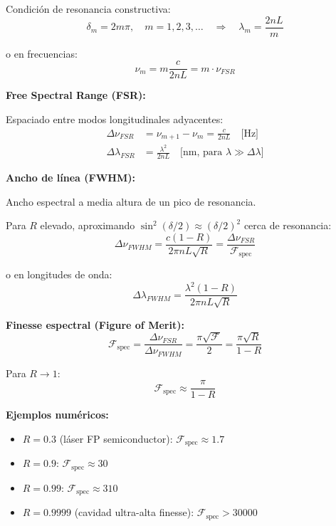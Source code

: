 \documentclass[11pt,a4paper]{article}
\begin{document}
Condición de resonancia constructiva:
\begin{equation}
    \delta_m = 2m\pi, \quad m = 1, 2, 3, \ldots \quad \Rightarrow \quad \lambda_m = \frac{2nL}{m}
\end{equation}

o en frecuencias:
\begin{equation}
    \nu_m = m\frac{c}{2nL} = m \cdot \nu_{FSR}
\end{equation}

\textbf{Free Spectral Range (FSR):}

Espaciado entre modos longitudinales adyacentes:
\begin{align}
    \Delta\nu_{FSR} &= \nu_{m+1} - \nu_m = \frac{c}{2nL} \quad \text{[Hz]}\\
    \Delta\lambda_{FSR} &= \frac{\lambda^2}{2nL} \quad \text{[nm, para } \lambda \gg \Delta\lambda\text{]}
\end{align}

\textbf{Ancho de línea (FWHM):}

Ancho espectral a media altura de un pico de resonancia.

Para $R$ elevado, aproximando $\sin^2(\delta/2) \approx (\delta/2)^2$ cerca de resonancia:
\begin{equation}
    \Delta\nu_{FWHM} = \frac{c(1-R)}{2\pi nL\sqrt{R}} = \frac{\Delta\nu_{FSR}}{\mathcal{F}_{\text{spec}}}
\end{equation}

o en longitudes de onda:
\begin{equation}
    \Delta\lambda_{FWHM} = \frac{\lambda^2(1-R)}{2\pi nL\sqrt{R}}
\end{equation}

\textbf{Finesse espectral (Figure of Merit):}
\begin{equation}
    \mathcal{F}_{\text{spec}} = \frac{\Delta\nu_{FSR}}{\Delta\nu_{FWHM}} = \frac{\pi\sqrt{\mathcal{F}}}{2} = \frac{\pi\sqrt{R}}{1-R}
\end{equation}

Para $R \to 1$:
\begin{equation}
    \mathcal{F}_{\text{spec}} \approx \frac{\pi}{1-R}
\end{equation}

\textbf{Ejemplos numéricos:}
\begin{itemize}
    \item $R = 0.3$ (láser FP semiconductor): $\mathcal{F}_{\text{spec}} \approx 1.7$
    \item $R = 0.9$: $\mathcal{F}_{\text{spec}} \approx 30$
    \item $R = 0.99$: $\mathcal{F}_{\text{spec}} \approx 310$
    \item $R = 0.9999$ (cavidad ultra-alta finesse): $\mathcal{F}_{\text{spec}} > 30000$
\end{itemize}
\end{document}
